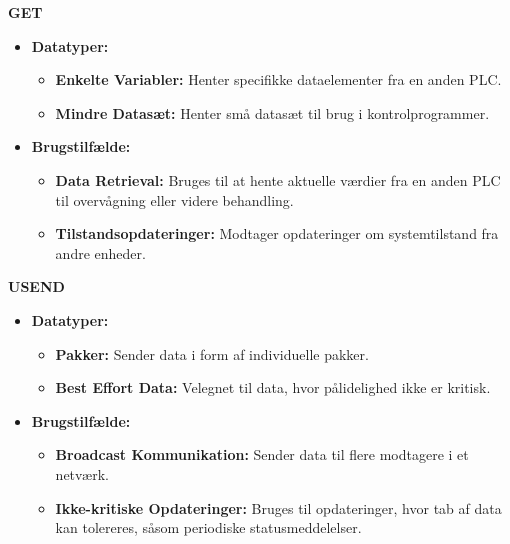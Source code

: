 \noindent\textbf{GET}
\begin{itemize}
	\item \textbf{Datatyper:}
	\begin{itemize}
		\item \textbf{Enkelte Variabler:} Henter specifikke dataelementer fra en anden PLC.
		\item \textbf{Mindre Datasæt:} Henter små datasæt til brug i kontrolprogrammer.
	\end{itemize}
	\item \textbf{Brugstilfælde:}
	\begin{itemize}
		\item \textbf{Data Retrieval:} Bruges til at hente aktuelle værdier fra en anden PLC til overvågning eller videre behandling.
		\item \textbf{Tilstandsopdateringer:} Modtager opdateringer om systemtilstand fra andre enheder.
	\end{itemize}
\end{itemize}

\noindent\textbf{USEND}
\begin{itemize}
	\item \textbf{Datatyper:}
	\begin{itemize}
		\item \textbf{Pakker:} Sender data i form af individuelle pakker.
		\item \textbf{Best Effort Data:} Velegnet til data, hvor pålidelighed ikke er kritisk.
	\end{itemize}
	\item \textbf{Brugstilfælde:}
	\begin{itemize}
		\item \textbf{Broadcast Kommunikation:} Sender data til flere modtagere i et netværk.
		\item \textbf{Ikke-kritiske Opdateringer:} Bruges til opdateringer, hvor tab af data kan tolereres, såsom periodiske statusmeddelelser.
	\end{itemize}
\end{itemize}

